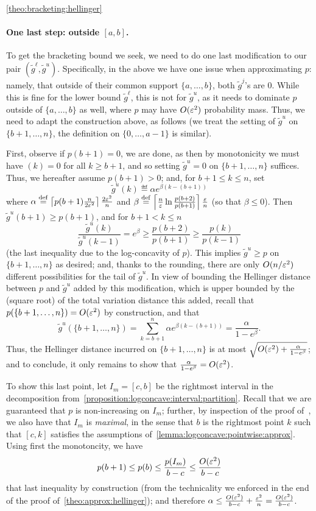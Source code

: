 \begin{proofof}{\cref{theo:bracketing:hellinger}}
\paragraph{One last step: outside $[a,b]$.} To get the bracketing bound we seek, we need to do one last modification to our pair $(\tilde{g}^\ell,\tilde{g}^u)$. Specifically, in the above we have one issue when approximating $p$: namely, that outside of their common support $\{a,\dots,b\}$, both $\tilde{g}^j$'s are $0$. While this is fine for the lower bound $\tilde{g}^\ell$, this is not for $\tilde{g}^u$, as it needs to dominate $p$ outside of $\{a,\dots,b\}$ as well, where $p$ may have $O(\varepsilon^2)$  probability mass. Thus, we need to adapt the construction above, as follows (we treat the setting of $\tilde{g}^u$ on $\{b+1,\dots,n\}$, the definition on $\{0,\dots, a-1\}$ is similar).

First, observe if $p(b+1)=0$, we are done, as then by monotonicity we must have $(k)=0$ for all $k\geq b+1$, and so setting $\tilde{g}^u=0$ on $\{b+1,\dots,n\}$ suffices. Thus, we hereafter assume $p(b+1)>0$; and, for $b+1\leq k\leq n$, set
\[
    \tilde{g}^u(k) \eqdef \alpha e^{\beta(k-(b+1))}
\]
where $\alpha \stackrel{\rm def}{=} \left\lceil p(b+1)\frac{n}{2\varepsilon^2} \right\rceil\frac{2\varepsilon^2}{n}$ and $\beta \stackrel{\rm def}{=} \left\lceil \frac{n}{\varepsilon}\ln \frac{p(b+2)}{p(b+1)} \right\rceil\frac{\varepsilon}{n}$ (so that $\beta \leq 0$). Then $\tilde{g}^u(b+1)\geq p(b+1)$, and for $b+1<k\leq n$
\[
    \frac{\tilde{g}^u(k)}{\tilde{g}^u(k-1)} = e^\beta \geq \frac{p(b+2)}{p(b+1)} \geq \frac{p(k)}{p(k-1)}
\]
(the last inequality due to the log-concavity of $p$). This implies $\tilde{g}^u\geq p$ on $\{b+1,\dots,n\}$ as desired; and, thanks to the rounding, there are only $O(n/\varepsilon^2)$ different possibilities for the tail of $\tilde{g}^u$. 
In view of bounding the Hellinger distance between $p$ and $\tilde{g}^u$ added by this modification, which is upper bounded by the (square root) of the total variation distance this added, recall that $p(\{b+1,\dots,n\})=O(\varepsilon^2)$ by construction, and that
\[
    \tilde{g}^u(\{b+1,\dots,n\}) = \sum_{k=b+1}^n \alpha e^{\beta(k-(b+1))} = \frac{\alpha}{1-e^\beta}.
\]
Thus, the Hellinger distance incurred on $\{b+1,\dots,n\}$ is at most $\sqrt{O(\varepsilon^2)+\frac{\alpha}{1-e^\beta}}$; and to conclude, it only remains to show that $\frac{\alpha}{1-e^\beta} = O(\varepsilon^2)$.

To show this last point, let $I_m=[c,b]$ be the rightmost interval in the decomposition from~\cref{proposition:logconcave:interval:partition}. Recall that we are guaranteed that $p$ is non-increasing on $I_m$; further, by inspection of the proof of~\cite[Proposition 15]{DKS:16}, we also have that $I_m$ is \emph{maximal}, in the sense that $b$ is the rightmost point $k$ such that $[c,k]$ satisfies the assumptions of~\cref{lemma:logconcave:pointwise:approx}. Using first the monotoncity, we have
\[
    p(b+1)\leq p(b)\leq \frac{p(I_m)}{b-c} \leq \frac{O(\varepsilon^2)}{b-c}
\]
that last inequality by construction (from the technicality we enforced in the end of the proof of~\cref{theo:approx:hellinger}); and therefore $\alpha \leq \frac{O(\varepsilon^2)}{b-c} + \frac{\varepsilon^2}{n} = \frac{O(\varepsilon^2)}{b-c}$.


\end{proofof}
